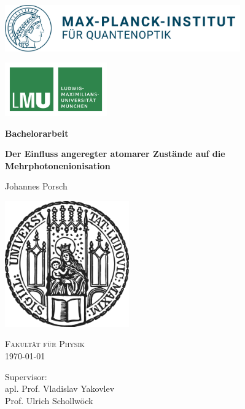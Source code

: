 \begin{titlepage}
    \centering
    
    \begin{minipage}{0.5\textwidth}
        \includegraphics[height=2cm]{figures/mpq.png}
    \end{minipage}
    \hfill
    \begin{minipage}{0.3\textwidth}
        \includegraphics[height=2.3cm]{figures/lmu-logo.pdf}
    \end{minipage}

    
    \vspace{2cm}

    {\Large \bfseries Bachelorarbeit}

    \vspace{0.5cm}
    
    {\huge\bfseries Der Einfluss angeregter atomarer Zustände auf die Mehrphotonenionisation\\[0.4cm]}
    
    \vspace{1.5cm}
    
    {\Large Johannes Porsch}
    
    
    \vfill
    
    \includegraphics[width = 0.4\textwidth]{figures/sigillum.png}

    \vfill
    \textsc{Fakultät für Physik}\\
    \vspace{1cm}
    {\Large \today}
    \vfill

    Supervisor: \\apl. Prof. Vladislav Yakovlev \\Prof. Ulrich Schollwöck 
    
\end{titlepage}